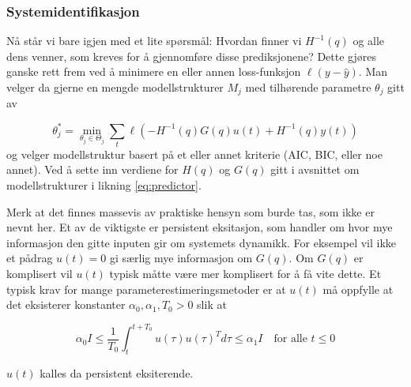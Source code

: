 \subsubsection{Systemidentifikasjon}
Nå står vi bare igjen med et lite spørsmål: Hvordan finner vi $H^{-1}(q)$ og alle dens venner, som kreves for å gjennomføre disse prediksjonene? Dette gjøres ganske rett frem ved å minimere en eller annen loss-funksjon $\ell ( y - \hat{y} )$. Man velger da gjerne en mengde modellstrukturer $M_j$ med tilhørende parametre $\theta_j$ gitt av

\begin{equation}
	\theta_{j}^{*}=\underset{\theta_{j} \in \Theta_{j}}{\min } \sum_{t} \ell\left(-H^{-1}(q) G(q) u(t)+H^{-1}(q) y(t)\right)
\end{equation}
og velger modellstruktur basert på et eller annet kriterie (AIC, BIC, eller noe annet). Ved å sette inn verdiene for $H(q)$ og $G(q)$ gitt i avsnittet om modellstrukturer i likning \ref{eq:predictor}.

Merk at det finnes massevis av praktiske hensyn som burde tas, som ikke er nevnt her. Et av de viktigste er persistent eksitasjon, som handler om hvor mye informasjon den gitte inputen gir om systemets dynamikk. For eksempel vil ikke et pådrag $u(t) = 0$ gi særlig mye informasjon om $G(q)$. Om $G(q)$ er komplisert vil $u(t)$ typisk måtte være mer komplisert for å få vite dette. Et typisk krav for mange parameterestimeringsmetoder er at $u(t)$ må oppfylle at det eksisterer konstanter $\alpha_0, \alpha_1, T_0 > 0$ slik at 

\begin{equation}
	\alpha_0 I \leq \frac{1}{T_0} \int_t^{t + T_0} u(\tau) u(\tau)^T d\tau \leq \alpha_1 I \quad \textrm{for alle } t \leq 0
\end{equation}

$u(t)$ kalles da persistent eksiterende.

